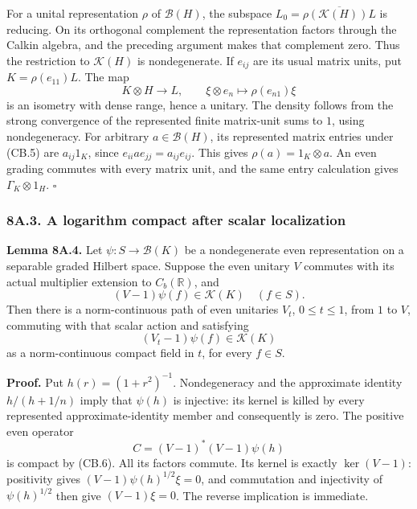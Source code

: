 \documentclass[
  11pt,
]{article}
\begin{document}
For a unital representation \(\rho\) of \(\mathcal B(H)\), the subspace
\(L_0=\overline{\rho(\mathcal K(H))L}\) is reducing. On its orthogonal
complement the representation factors through the Calkin algebra, and
the preceding argument makes that complement zero. Thus the restriction
to \(\mathcal K(H)\) is nondegenerate. If \(e_{ij}\) are its usual
matrix units, put \(K=\rho(e_{11})L\). The map \[
 K\otimes H\longrightarrow L,
 \qquad \xi\otimes e_n\longmapsto\rho(e_{n1})\xi
 \tag{CB.5}
\] is an isometry with dense range, hence a unitary. The density follows
from the strong convergence of the represented finite matrix-unit sums
to \(1\), using nondegeneracy. For arbitrary \(a\in\mathcal B(H)\), its
represented matrix entries under (CB.5) are \(a_{ij}1_K\), since
\(e_{ii}ae_{jj}=a_{ij}e_{ij}\). This gives \(\rho(a)=1_K\otimes a\). An
even grading commutes with every matrix unit, and the same entry
calculation gives \(\Gamma_K\otimes1_H\). \(\square\)

\subsubsection{8A.3. A logarithm compact after scalar
localization}\label{a.3.-a-logarithm-compact-after-scalar-localization}

\textbf{Lemma 8A.4.} Let \(\psi:S\to\mathcal B(K)\) be a nondegenerate
even representation on a separable graded Hilbert space. Suppose the
even unitary \(V\) commutes with its actual multiplier extension to
\(C_b(\mathbb R)\), and \[
 (V-1)\psi(f)\in\mathcal K(K)\quad(f\in S).
 \tag{CB.6}
\] Then there is a norm-continuous path of even unitaries \(V_t\),
\(0\leq t\leq1\), from \(1\) to \(V\), commuting with that scalar action
and satisfying \[
 (V_t-1)\psi(f)\in\mathcal K(K)
\] as a norm-continuous compact field in \(t\), for every \(f\in S\).

\textbf{Proof.} Put \(h(r)=(1+r^2)^{-1}\). Nondegeneracy and the
approximate identity \(h/(h+1/n)\) imply that \(\psi(h)\) is injective:
its kernel is killed by every represented approximate-identity member
and consequently is zero. The positive even operator \[
 C=(V-1)^*(V-1)\psi(h)
 \tag{CB.7}
\] is compact by (CB.6). All its factors commute. Its kernel is exactly
\(\ker(V-1)\): positivity gives \((V-1)\psi(h)^{1/2}\xi=0\), and
commutation and injectivity of \(\psi(h)^{1/2}\) then give
\((V-1)\xi=0\). The reverse implication is immediate.
\end{document}
